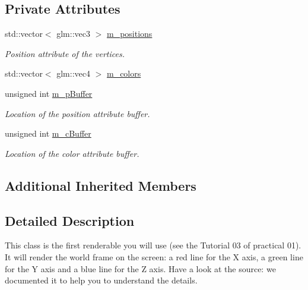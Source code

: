 \subsection*{Private Attributes}
\begin{DoxyCompactItemize}
\item 
std\+::vector$<$ glm\+::vec3 $>$ \hyperlink{classFrameRenderable_a6cb58f4ca3a0198e628da450f2a4c731}{m\+\_\+positions}
\begin{DoxyCompactList}\small\item\em Position attribute of the vertices. \end{DoxyCompactList}\item 
std\+::vector$<$ glm\+::vec4 $>$ \hyperlink{classFrameRenderable_a95e44e90b8e1f1ac67967003aea63009}{m\+\_\+colors}
\item 
unsigned int \hyperlink{classFrameRenderable_a89c0e4abd391a47198729001a2d5f159}{m\+\_\+p\+Buffer}
\begin{DoxyCompactList}\small\item\em Location of the position attribute buffer. \end{DoxyCompactList}\item 
unsigned int \hyperlink{classFrameRenderable_a6c8bed148c506c1a26fd7fc3cc5c625a}{m\+\_\+c\+Buffer}
\begin{DoxyCompactList}\small\item\em Location of the color attribute buffer. \end{DoxyCompactList}\end{DoxyCompactItemize}
\subsection*{Additional Inherited Members}


\subsection{Detailed Description}
This class is the first renderable you will use (see the Tutorial 03 of practical 01). It will render the world frame on the screen\+: a red line for the X axis, a green line for the Y axis and a blue line for the Z axis. Have a look at the source\+: we documented it to help you to understand the details. 

